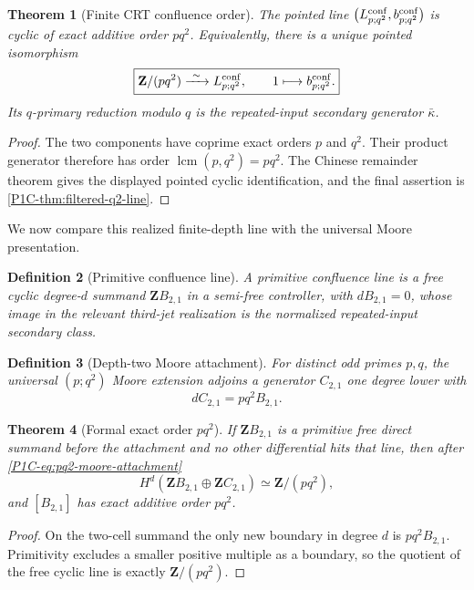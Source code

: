 \documentclass[11pt]{article}
\newtheorem{theorem}{Theorem}[section]
\newtheorem{definition}[theorem]{Definition}
\theoremstyle{remark}
\newcommand{\Z}{\mathbf Z}
\begin{document}
\begin{theorem}[Finite CRT confluence order]\label{P1C-thm:pq2-crt-confluence}
The pointed line $\bigl(L^{\rm conf}_{p;q^2},b^{\rm conf}_{p;q^2}\bigr)$ is cyclic of exact additive order $pq^2$.  Equivalently, there is a unique pointed isomorphism
\[
 \boxed{
 \Z/(pq^2)\xrightarrow{\ \sim\ }L^{\rm conf}_{p;q^2},
 \qquad
 1\longmapsto b^{\rm conf}_{p;q^2}.}
\]
Its $q$-primary reduction modulo $q$ is the repeated-input secondary generator $\bar\kappa$.
\end{theorem}

\begin{proof}
The two components have coprime exact orders $p$ and $q^2$.  Their product generator therefore has order $\operatorname{lcm}(p,q^2)=pq^2$.  The Chinese remainder theorem gives the displayed pointed cyclic identification, and the final assertion is \cref{P1C-thm:filtered-q2-line}.
\end{proof}

We now compare this realized finite-depth line with the universal Moore presentation.

\begin{definition}[Primitive confluence line]
A primitive confluence line is a free cyclic degree-$d$ summand $\Z B_{2,1}$ in a semi-free controller, with $dB_{2,1}=0$, whose image in the relevant third-jet realization is the normalized repeated-input secondary class.
\end{definition}

\begin{definition}[Depth-two Moore attachment]
For distinct odd primes $p,q$, the universal $(p;q^2)$ Moore extension adjoins a generator $C_{2,1}$ one degree lower with
\begin{equation}\label{P1C-eq:pq2-moore-attachment}
 dC_{2,1}=pq^2 B_{2,1}.
\end{equation}
\end{definition}

\begin{theorem}[Formal exact order $pq^2$]\label{P1C-thm:formal-pq2-order}
If $\Z B_{2,1}$ is a primitive free direct summand before the attachment and no other differential hits that line, then after \eqref{P1C-eq:pq2-moore-attachment}
\[
 H^d(\Z B_{2,1}\oplus\Z C_{2,1})\simeq\Z/(pq^2),
\]
and $[B_{2,1}]$ has exact additive order $pq^2$.
\end{theorem}

\begin{proof}
On the two-cell summand the only new boundary in degree $d$ is $pq^2B_{2,1}$.  Primitivity excludes a smaller positive multiple as a boundary, so the quotient of the free cyclic line is exactly $\Z/(pq^2)$.
\end{proof}
\end{document}
